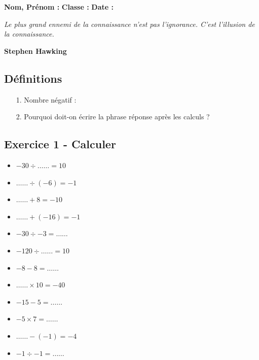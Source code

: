\Pointilles[3]

\newpage

\textbf{Nom, Prénom :} \hspace{8cm} \textbf{Classe :} \hspace{3cm} \textbf{Date :}\\

\begin{center}
  \textit{Le plus grand ennemi de la connaissance n'est pas l'ignorance. C'est l'illusion de la connaissance.} 
  
  \textbf{Stephen Hawking}
\end{center}


\subsection*{Définitions}
  \begin{enumerate}
    \item[1.] Nombre négatif : \dotfill \\
    \Pointilles[1]
    \item[2.] Pourquoi doit-on écrire la phrase réponse après les calculs ?  \dotfill \\
    \Pointilles[2]
  \end{enumerate}

\subsection*{Exercice 1 - Calculer}

\begin{multicols}{3}\noindent
  \begin{itemize}[label={$\bullet$}]
        \item $-30 \div \ldots\ldots = 10$
        \item $\ldots\ldots \div \left( -6\right) = -1$
        \item $\ldots\ldots + 8 = -10$
        \item $\ldots\ldots + \left( -16\right) = -1$
        \item $-30 \div -3 = \ldots\ldots$
        \item $-120 \div \ldots\ldots = 10$
        \item $-8 - 8 = \ldots\ldots$
        \item $\ldots\ldots \times 10 = -40$
        \item $-15 - 5 = \ldots\ldots$
        \item $-5 \times 7 = \ldots\ldots$
        \item $\ldots\ldots - \left( -1\right) = -4$
        \item $-1 \div -1 = \ldots\ldots$
    \end{itemize}
  \end{multicols}

